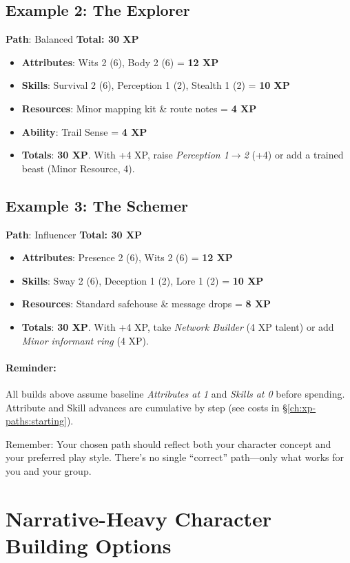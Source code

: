 \subsection*{Example 2: The Explorer}
\textbf{Path}: Balanced \quad \textbf{Total: 30 XP}
\begin{itemize}
\item \textbf{Attributes}: Wits 2 (6), Body 2 (6) = \textbf{12 XP}
\item \textbf{Skills}: Survival 2 (6), Perception 1 (2), Stealth 1 (2) = \textbf{10 XP}
\item \textbf{Resources}: Minor mapping kit \& route notes = \textbf{4 XP}
\item \textbf{Ability}: Trail Sense = \textbf{4 XP}
\item \textbf{Totals}: \textbf{30 XP}. With +4 XP, raise \emph{Perception 1$\to$2} (+4) or add a trained beast (Minor Resource, 4).
\end{itemize}

\subsection*{Example 3: The Schemer}
\textbf{Path}: Influencer \quad \textbf{Total: 30 XP}
\begin{itemize}
\item \textbf{Attributes}: Presence 2 (6), Wits 2 (6) = \textbf{12 XP}
\item \textbf{Skills}: Sway 2 (6), Deception 1 (2), Lore 1 (2) = \textbf{10 XP}
\item \textbf{Resources}: Standard safehouse \& message drops = \textbf{8 XP}
\item \textbf{Totals}: \textbf{30 XP}. With +4 XP, take \emph{Network Builder} (4 XP talent) or add \emph{Minor informant ring} (4 XP).
\end{itemize}

\paragraph{Reminder:}
All builds above assume baseline \emph{Attributes at 1} and \emph{Skills at 0} before spending. Attribute and Skill advances are cumulative by step (see costs in \S\ref{ch:xp-paths:starting}).

Remember: Your chosen path should reflect both your character concept and your preferred play style. There's no single ``correct'' path—only what works for you and your group.

\section{Narrative-Heavy Character Building Options}

